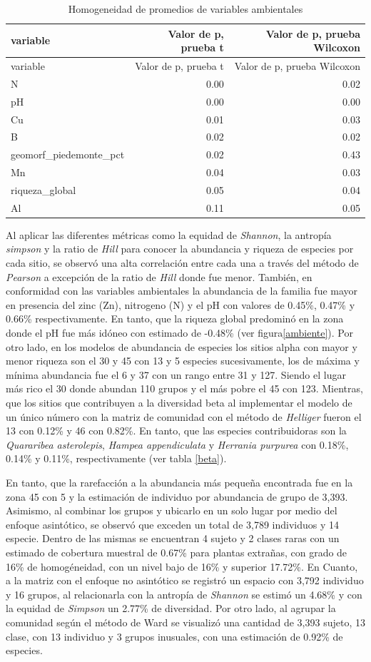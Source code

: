 \documentclass[11pt,]{article}
\begin{document}
\begin{longtable}[]{@{}lrr@{}}
\caption{Homogeneidad de promedios de variables
ambientales\label{promedio}}\tabularnewline
\toprule
variable & Valor de p, prueba t & Valor de p, prueba
Wilcoxon\tabularnewline
\midrule
\endfirsthead
\toprule
variable & Valor de p, prueba t & Valor de p, prueba
Wilcoxon\tabularnewline
\midrule
\endhead
N & 0.00 & 0.02\tabularnewline
pH & 0.00 & 0.00\tabularnewline
Cu & 0.01 & 0.03\tabularnewline
B & 0.02 & 0.02\tabularnewline
geomorf\_piedemonte\_pct & 0.02 & 0.43\tabularnewline
Mn & 0.04 & 0.03\tabularnewline
riqueza\_global & 0.05 & 0.04\tabularnewline
Al & 0.11 & 0.05\tabularnewline
\bottomrule
\end{longtable}

Al aplicar las diferentes métricas como la equidad de \emph{Shannon}, la
antropía \emph{simpson} y la ratio de \emph{Hill} para conocer la
abundancia y riqueza de especies por cada sitio, se observó una alta
correlación entre cada una a través del método de \emph{Pearson} a
excepción de la ratio de \emph{Hill} donde fue menor. También, en
conformidad con las variables ambientales la abundancia de la familia
fue mayor en presencia del zinc (Zn), nitrogeno (N) y el pH con valores
de 0.45\%, 0.47\% y 0.66\% respectivamente. En tanto, que la riqueza
global predominó en la zona donde el pH fue más idóneo con estimado de
-0.48\% (ver figura\ref{ambiente}). Por otro lado, en los modelos de
abundancia de especies los sitios alpha con mayor y menor riqueza son el
30 y 45 con 13 y 5 especies sucesivamente, los de máxima y mínima
abundancia fue el 6 y 37 con un rango entre 31 y 127. Siendo el lugar
más rico el 30 donde abundan 110 grupos y el más pobre el 45 con 123.
Mientras, que los sitios que contribuyen a la diversidad beta al
implementar el modelo de un único número con la matriz de comunidad con
el método de \emph{Helliger} fueron el 13 con 0.12\% y 46 con 0.82\%. En
tanto, que las especies contribuidoras son la \emph{Quararibea
asterolepis}, \emph{Hampea appendiculata} y \emph{Herrania purpurea} con
0.18\%, 0.14\% y 0.11\%, respectivamente (ver tabla \ref{beta}).

En tanto, que la rarefacción a la abundancia más pequeña encontrada fue
en la zona 45 con 5 y la estimación de individuo por abundancia de grupo
de 3,393. Asimismo, al combinar los grupos y ubicarlo en un solo lugar
por medio del enfoque asintótico, se observó que exceden un total de
3,789 individuos y 14 especie. Dentro de las mismas se encuentran 4
sujeto y 2 clases raras con un estimado de cobertura muestral de 0.67\%
para plantas extrañas, con grado de 16\% de homogéneidad, con un nivel
bajo de 16\% y superior 17.72\%. En Cuanto, a la matriz con el enfoque
no asintótico se registró un espacio con 3,792 individuo y 16 grupos, al
relacionarla con la antropía de \emph{Shannon} se estimó un 4.68\% y con
la equidad de \emph{Simpson} un 2.77\% de diversidad. Por otro lado, al
agrupar la comunidad según el método de Ward se visualizó una cantidad
de 3,393 sujeto, 13 clase, con 13 individuo y 3 grupos inusuales, con
una estimación de 0.92\% de especies.
\end{document}
